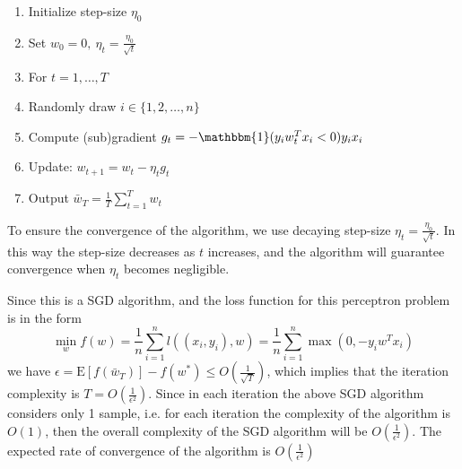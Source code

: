 \documentclass[12pt,oneside,a4paper]{article}
\begin{document}
\begin{enumerate}
\item Initialize step-size $\eta_{0}$
\item Set $w_{0} = 0, ~ \eta_{t} = \frac{\eta_{0}}{\sqrt{t}}$
\item For $t = 1, \dots, T$
\item \hspace{2ex} Randomly draw $i \in \{ 1, 2, \dots, n \}$
\item \hspace{2ex} Compute (sub)gradient $g_{t} = -\mathbbm{1}(y_{i}w_{t}^{T}x_{i} < 0)y_{i}x_{i}$
\item \hspace{2ex} Update: $w_{t + 1} = w_{t} - \eta_{t} g_{t}$
\item Output $\bar{w}_{T} = \frac{1}{T}\sum_{t = 1}^{T}w_{t}$
\end{enumerate}

To ensure the convergence of the algorithm, we use decaying step-size $\eta_{t} = \frac{\eta_{0}}{\sqrt{t}}$. In this way the step-size decreases as $t$ increases, and the algorithm will guarantee convergence when $\eta_{t}$ becomes negligible.

Since this is a SGD algorithm, and the loss function for this perceptron problem is in the form
$$\min_{w}f(w) = \frac{1}{n}\sum_{i = 1}^{n}l((x_{i}, y_{i}), w) = \frac{1}{n}\sum_{i = 1}^{n}\max(0, -y_{i}w^{T}x_{i})$$
we have $\epsilon = \mathrm{E}[f(\bar{w}_{T})] - f(w^{*}) \leq O(\frac{1}{\sqrt{T}})$, which implies that the iteration complexity is $T = O(\frac{1}{\epsilon^2})$. Since in each iteration the above SGD algorithm considers only 1 sample, i.e. for each iteration the complexity of the algorithm is $O(1)$, then the overall complexity of the SGD algorithm will be $O(\frac{1}{\epsilon^2})$. The expected rate of convergence of the algorithm is $O(\frac{1}{\epsilon^2})$
\end{document}
